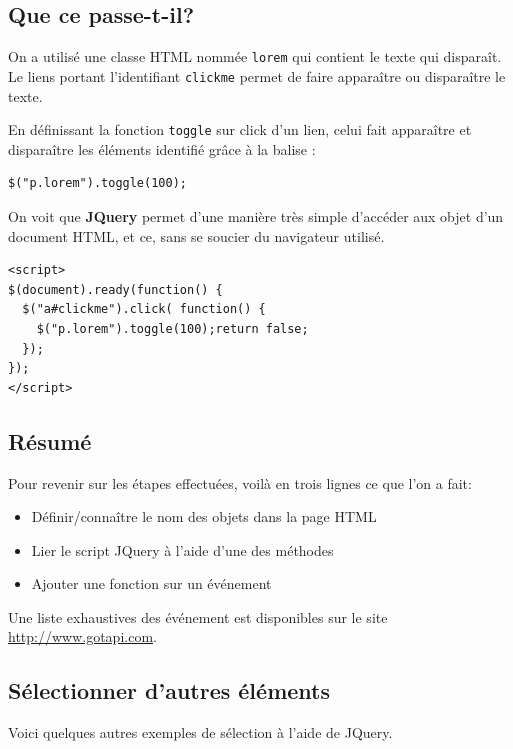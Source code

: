\documentclass[10pt,a4paper,titlepage]{article}
\begin{document}
\subsection{Que ce passe-t-il?}

On a utilisé une classe HTML nommée \texttt{lorem} qui contient le texte qui disparaît. Le liens portant l'identifiant \texttt{clickme} permet de faire apparaître ou disparaître le texte. 

En définissant la fonction \texttt{toggle} sur click d'un lien, celui fait apparaître et  disparaître les éléments identifié grâce à la balise : 

\begin{lstlisting}
$("p.lorem").toggle(100);
\end{lstlisting}

On voit que \textbf{JQuery} permet d'une manière très simple d'accéder aux objet d'un document HTML, et ce, sans se soucier du navigateur utilisé.

\begin{lstlisting}
<script>
$(document).ready(function() {
  $("a#clickme").click( function() {
    $("p.lorem").toggle(100);return false;
  });
});
</script>
\end{lstlisting}

\subsection{Résumé}

Pour revenir sur les étapes effectuées, voilà en trois lignes ce que l'on a fait: \\

\begin{itemize}
	\item Définir/connaître le nom des objets dans la page HTML
	\item Lier le script JQuery à l'aide d'une des méthodes
	\item Ajouter une fonction sur un événement
\end{itemize}

Une liste exhaustives des événement est disponibles sur le site \url{http://www.gotapi.com}.

\subsection{Sélectionner d'autres éléments}

Voici quelques autres exemples de sélection à l'aide de JQuery. 
\end{document}
